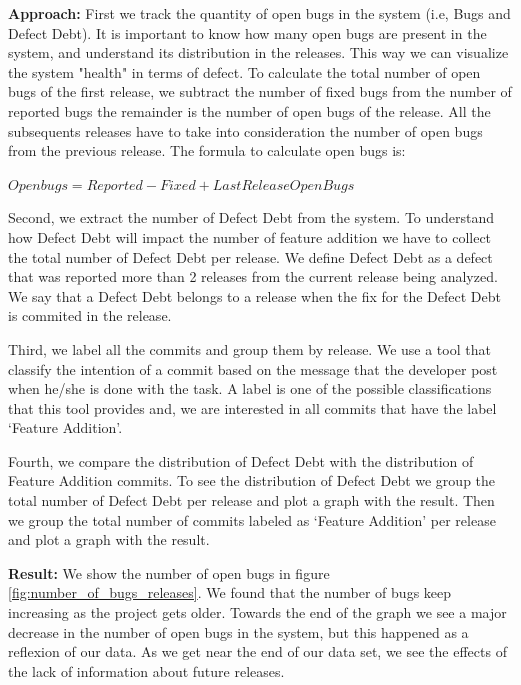 \vspace{1mm}
\noindent\textbf{Approach:} First we track the quantity of open bugs in the system (i.e, Bugs and Defect Debt). It is important to know how many open bugs are present in the system, and understand its distribution in the releases. This way we can visualize the system "health" in terms of defect. To calculate the total number of open bugs of the first release, we subtract the number of fixed bugs from the number of reported bugs the remainder is the number of open bugs of the release. All the subsequents releases have to take into consideration the number of open bugs from the previous release. The formula to calculate open bugs is:

\begin{center}
	$Open bugs=  Reported - Fixed + Last Release OpenBugs$
\end{center}

Second, we extract the number of  Defect Debt from the system. To understand how Defect Debt will impact the number of feature addition we have to collect the total number of Defect Debt per release. We define Defect Debt as a defect that was reported more than 2 releases from the current release being analyzed. We say that a Defect Debt belongs to a release when the fix for the Defect Debt is commited in the release.
 
Third, we label all the commits and group them by release. We use a tool that classify the intention of a commit based on the message that the developer post when he/she is done with the task. A label is one of the possible classifications that this tool provides and, we are interested in all commits that have the label `Feature Addition'.   

Fourth, we compare the distribution of Defect Debt with the distribution of Feature Addition commits. To see the distribution of Defect Debt we group the total number of Defect Debt per release and plot a graph with the result. Then we group the total number of commits labeled as `Feature Addition' per release and plot a graph with the result.

\vspace{1mm}
\noindent\textbf{Result:} We show the number of open bugs in figure \ref{fig:number_of_bugs_releases}. We found that the number of bugs keep increasing as the project gets older. Towards the end of the graph we see a major decrease in the number of open bugs in the system, but this happened as a reflexion of our data. As we get near the end of our data set, we see the effects of the lack of information about future releases. 

